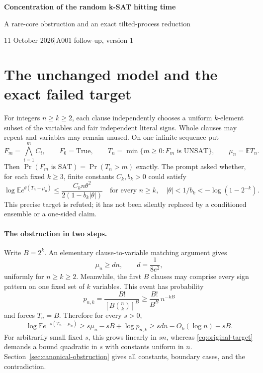 \documentclass[11pt,a4paper]{article}
\newcommand{\ReportTitle}{Concentration of the random k-SAT hitting time}
\newcommand{\ReportSubtitle}{A rare-core obstruction and an exact tilted-process reduction}
\begin{document}
\begin{center}
 {\Large\bfseries\color{ink}\ReportTitle\par}
 \vspace{3mm}
 {\large\ReportSubtitle\par}
 \vspace{2mm}
 {\small 11 October 2026\quad|\quad A001 follow-up, version 1}
\end{center}

\section{The unchanged model and the exact failed target}
For integers $n\ge k\ge2$, each clause independently chooses a uniform
$k$-element subset of the variables and fair independent literal signs.
Whole clauses may repeat and variables may remain unused. On one infinite
sequence put
\[
 F_m=\bigwedge_{i=1}^m C_i,\qquad F_0=\mathrm{True},\qquad
 T_n=\min\{m\ge0:F_m\text{ is UNSAT}\},\qquad \mu_n=\mathbb ET_n.
\]
Then $\Pr(F_m\text{ is SAT})=\Pr(T_n>m)$ exactly. The prompt asked whether,
for each fixed $k\ge3$, finite constants $C_k,b_k>0$ could satisfy
\begin{equation}
 \log\mathbb E e^{\theta(T_n-\mu_n)}
 \le \frac{C_k n\theta^2}{2(1-b_k|\theta|)}
 \quad\text{for every }n\ge k,\quad
 |\theta|<1/b_k<-\log(1-2^{-k}).
 \label{eq:original-target}
\end{equation}
This precise target is refuted; it has not been silently replaced by
a conditioned ensemble or a one-sided claim.

\paragraph{The obstruction in two steps.}
Write $B=2^k$. An elementary clause-to-variable matching argument gives
\[
 \mu_n\ge dn,\qquad d=\frac1{8e^2},
\]
uniformly for $n\ge k\ge2$. Meanwhile, the first $B$ clauses may comprise
every sign pattern on one fixed set of $k$ variables. This event has
probability
\[
 p_{n,k}=\frac{B!}{[B\binom nk]^B}
 \ge \frac{B!}{B^B}\,n^{-kB}
\]
and forces $T_n=B$. Therefore for every $s>0$,
\begin{equation}
 \log\mathbb E e^{-s(T_n-\mu_n)}
 \ge s\mu_n-sB+\log p_{n,k}
 \ge sdn-O_k(\log n)-sB.
 \label{eq:summary-obstruction}
\end{equation}
For arbitrarily small fixed $s$, this grows linearly in $sn$, whereas
\eqref{eq:original-target} demands a bound quadratic in $s$ with constants
uniform in $n$. Section~\ref{sec:canonical-obstruction} gives all constants,
boundary cases, and the contradiction.
\end{document}
